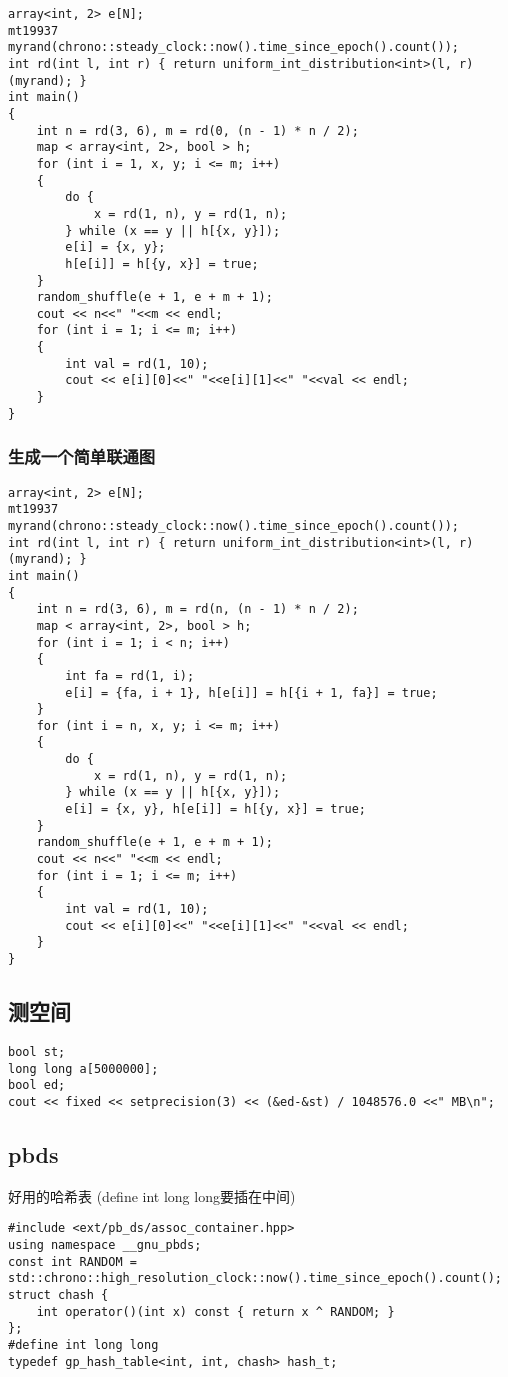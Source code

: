 \documentclass[a4paper, fontset=none]{ctexart}
\begin{document}
\begin{verbatim}
array<int, 2> e[N];
mt19937 myrand(chrono::steady_clock::now().time_since_epoch().count());
int rd(int l, int r) { return uniform_int_distribution<int>(l, r)(myrand); }
int main()
{
    int n = rd(3, 6), m = rd(0, (n - 1) * n / 2);
    map < array<int, 2>, bool > h;
    for (int i = 1, x, y; i <= m; i++)
    {
        do {
            x = rd(1, n), y = rd(1, n);
        } while (x == y || h[{x, y}]);
        e[i] = {x, y};
        h[e[i]] = h[{y, x}] = true;
    }
    random_shuffle(e + 1, e + m + 1);
    cout << n<<" "<<m << endl;
    for (int i = 1; i <= m; i++)
    {
        int val = rd(1, 10);
        cout << e[i][0]<<" "<<e[i][1]<<" "<<val << endl;
    }
}
\end{verbatim}
\subsubsection{生成一个简单联通图}

\begin{verbatim}
array<int, 2> e[N];
mt19937 myrand(chrono::steady_clock::now().time_since_epoch().count());
int rd(int l, int r) { return uniform_int_distribution<int>(l, r)(myrand); }
int main()
{
    int n = rd(3, 6), m = rd(n, (n - 1) * n / 2);
    map < array<int, 2>, bool > h;
    for (int i = 1; i < n; i++)
    {
        int fa = rd(1, i);
        e[i] = {fa, i + 1}, h[e[i]] = h[{i + 1, fa}] = true;
    }
    for (int i = n, x, y; i <= m; i++)
    {
        do {
            x = rd(1, n), y = rd(1, n);
        } while (x == y || h[{x, y}]);
        e[i] = {x, y}, h[e[i]] = h[{y, x}] = true;
    }
    random_shuffle(e + 1, e + m + 1);
    cout << n<<" "<<m << endl;
    for (int i = 1; i <= m; i++)
    {
        int val = rd(1, 10);
        cout << e[i][0]<<" "<<e[i][1]<<" "<<val << endl;
    }
}
\end{verbatim}
\subsection{测空间}

\begin{verbatim}
bool st;
long long a[5000000];
bool ed;
cout << fixed << setprecision(3) << (&ed-&st) / 1048576.0 <<" MB\n";
\end{verbatim}
\subsection{pbds}
好用的哈希表 (define int long long要插在中间)
\begin{verbatim}
#include <ext/pb_ds/assoc_container.hpp>
using namespace __gnu_pbds;
const int RANDOM = std::chrono::high_resolution_clock::now().time_since_epoch().count();
struct chash {
    int operator()(int x) const { return x ^ RANDOM; }
};
#define int long long
typedef gp_hash_table<int, int, chash> hash_t;
\end{verbatim}
\end{document}

